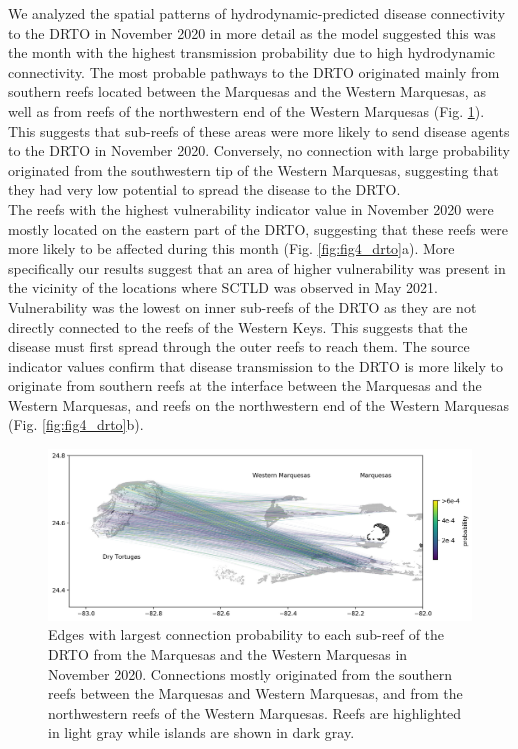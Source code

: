 We analyzed the spatial patterns of hydrodynamic-predicted disease connectivity to the DRTO in November 2020 in more detail as the model suggested this was the month with the highest transmission probability due to high hydrodynamic connectivity. The most probable pathways to the DRTO originated mainly from southern reefs located between the Marquesas and the Western Marquesas, as well as from reefs of the northwestern end of the Western Marquesas (Fig. \ref{fig:fig3_drto}). This suggests that sub-reefs of these areas were more likely to send disease agents to the DRTO in November 2020. Conversely, no connection with large probability originated from the southwestern tip of the Western Marquesas, suggesting that they had very low potential to spread the disease to the DRTO. \\
The reefs with the highest vulnerability indicator value in November 2020 were mostly located on the eastern part of the DRTO, suggesting that these reefs were more likely to be affected during this month (Fig. \ref{fig:fig4_drto}a). More specifically our results suggest that an area of higher vulnerability was present in the vicinity of the locations where SCTLD was observed in May 2021. Vulnerability was the lowest on inner sub-reefs of the DRTO as they are not directly connected to the reefs of the Western Keys. This suggests that the disease must first spread through the outer reefs to reach them. The source indicator values confirm that disease transmission to the DRTO is more likely to originate from southern reefs at the interface between the Marquesas and the Western Marquesas, and reefs on the northwestern end of the Western Marquesas (Fig. \ref{fig:fig4_drto}b).

\begin{figure}
    \centering
    \includegraphics[width=.99\textwidth]{chapters/drto/figures/fig3.jpg}
    \caption{Edges with largest connection probability to each sub-reef of the DRTO from the Marquesas and the Western Marquesas in November 2020. Connections mostly originated from the southern reefs between the Marquesas and Western Marquesas, and from the northwestern reefs of the Western Marquesas. Reefs are highlighted in light gray while islands are shown in dark gray.}
    \label{fig:fig3_drto}
\end{figure}

